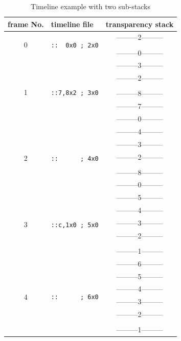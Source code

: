 \documentclass[a4paper]{article}
\begin{document}
\begin{table}[t]\centering
\caption{Timeline example with two sub-stacks}\label{tab:multi}
\begin{tabular}[t]{c|l|c}\hline
frame No. & timeline file & transparency stack\\\hline\hline
\multirow{3}{*}{0} & \multirow{3}{*}{\tt::\ \ 0x0 ; 2x0} & ---------2---------\\&&{\tiny\dotfill}\\&&---------0---------\\\cline{1-1}\cline{3-3}
\multirow{6}{*}{1} & \multirow{6}{*}{\tt::7,8x2 ; 3x0} & ---------3---------\\&&---------2---------\\&&\tiny\dotfill\\&&---------8---------\\&&---------7---------\\&&---------0---------\\\cline{1-1}\cline{3-3}
\multirow{6}{*}{2} & \multirow{6}{*}{\tt::\ \ \ \ \ \ ; 4x0} & ---------4---------\\&&---------3---------\\&&---------2---------\\&&\tiny\dotfill\\&&---------8---------\\&&---------0---------\\\cline{1-1}\cline{3-3}
\multirow{6}{*}{3} & \multirow{6}{*}{\tt::c,1x0 ; 5x0} & ---------5---------\\&&---------4---------\\&&---------3---------\\&&---------2---------\\&&\tiny\dotfill\\&&---------1---------\\\cline{1-1}\cline{3-3}
\multirow{7}{*}{4} & \multirow{7}{*}{\tt::\ \ \ \ \ \ ; 6x0} & ---------6---------\\&&---------5---------\\&&---------4---------\\&&---------3---------\\&&---------2---------\\&&\tiny\dotfill\\&&---------1---------\\\hline
\end{tabular}
\end{table}
\end{document}
